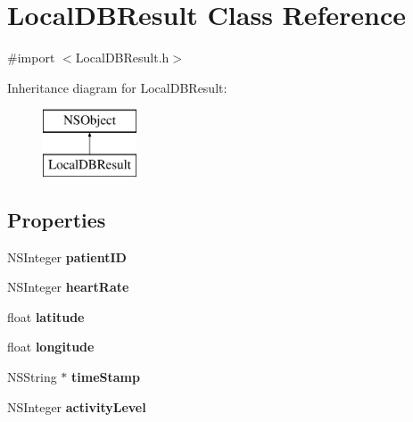 \hypertarget{interface_local_d_b_result}{\section{Local\-D\-B\-Result Class Reference}
\label{interface_local_d_b_result}
}


{\ttfamily \#import $<$Local\-D\-B\-Result.\-h$>$}

Inheritance diagram for Local\-D\-B\-Result\-:\begin{figure}[H]
\begin{center}
\leavevmode
\includegraphics[height=2.000000cm]{interface_local_d_b_result}
\end{center}
\end{figure}
\subsection*{Properties}
\begin{DoxyCompactItemize}
\item 
\hypertarget{interface_local_d_b_result_a5cdd651e87ce4b0e2ed296fd1a54f271}{N\-S\-Integer {\bfseries patient\-I\-D}}\label{interface_local_d_b_result_a5cdd651e87ce4b0e2ed296fd1a54f271}

\item 
\hypertarget{interface_local_d_b_result_a59bb8d9536b92e3bbd6c244d13771ccc}{N\-S\-Integer {\bfseries heart\-Rate}}\label{interface_local_d_b_result_a59bb8d9536b92e3bbd6c244d13771ccc}

\item 
\hypertarget{interface_local_d_b_result_a55f83e49659fb4d15db30117f90dcea7}{float {\bfseries latitude}}\label{interface_local_d_b_result_a55f83e49659fb4d15db30117f90dcea7}

\item 
\hypertarget{interface_local_d_b_result_ae50e0676b6cac4cad3e565c5caa117b2}{float {\bfseries longitude}}\label{interface_local_d_b_result_ae50e0676b6cac4cad3e565c5caa117b2}

\item 
\hypertarget{interface_local_d_b_result_a7538fcbcfd150e5353d3d4e531bef2bc}{N\-S\-String $\ast$ {\bfseries time\-Stamp}}\label{interface_local_d_b_result_a7538fcbcfd150e5353d3d4e531bef2bc}

\item 
\hypertarget{interface_local_d_b_result_a10d275e102bd14b0a071b5572fbf62d3}{N\-S\-Integer {\bfseries activity\-Level}}\label{interface_local_d_b_result_a10d275e102bd14b0a071b5572fbf62d3}

\end{DoxyCompactItemize}


